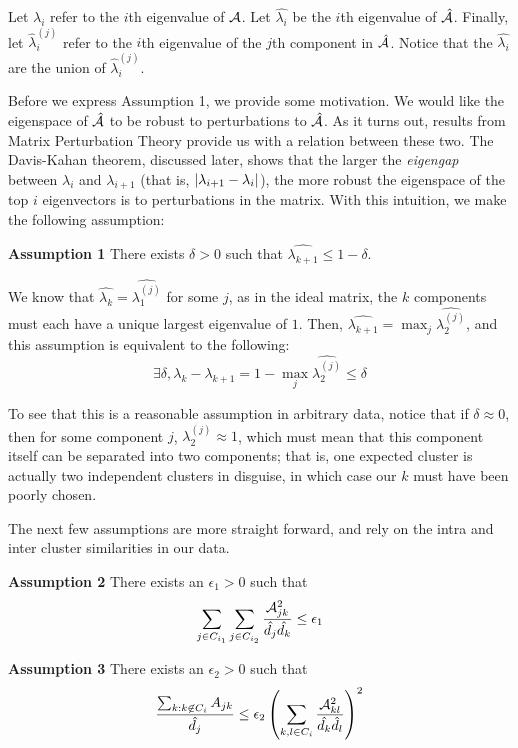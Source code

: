 Let $\lambda_i$ refer to the $i$th eigenvalue of $\mathcal{A}$. Let $\hat{\lambda_i}$
be the $i$th eigenvalue of $\hat{\mathcal{A}}$. Finally, let $\hat{\lambda}^{(j)}_i$
refer to the $i$th eigenvalue of the $j$th component in $\hat{\mathcal{A}}$. Notice that
the $\hat{\lambda_i}$ are the union of $\hat{\lambda}^{(j)}_i$.

Before we express Assumption 1, we provide some motivation. We would like
the eigenspace of $\hat{\mathcal{A}}$ to be robust to perturbations to $\hat{\mathcal{A}}$. As
it turns out, results from Matrix Perturbation Theory provide us with a relation
between these two. The Davis-Kahan theorem, discussed later, shows that the
larger the \textit{eigengap} between $\lambda_i$ and $\lambda_{i+1}$ (that is,
$\lvert\lambda_{i+1} - \lambda_i\rvert$), the more robust the eigenspace of the top
$i$ eigenvectors is to perturbations in the matrix. With this intuition, we
make the following assumption:

\textbf{Assumption 1} There exists $\delta > 0$ such that
$\hat{\lambda_{k+1}} \leq 1 - \delta$.

We know that $\hat{\lambda_k} = \hat{\lambda^{(j)}_1}$ for some $j$, as in the
ideal matrix, the $k$ components must each have a unique largest eigenvalue of
$1$. Then, $\hat{\lambda_{k+1}} = \max_j \hat{\lambda^{(j)}_2}$, and this
assumption is equivalent to the following:
\[ \exists \delta, \lambda_k - \lambda_{k+1} = 1 - \max_j \hat{\lambda^{(j)}_2} \leq \delta \]

To see that this is a reasonable assumption in arbitrary data, notice that if
$\delta \approx 0$, then for some component $j$, $\lambda^{(j)}_2 \approx 1$,
which must mean that this component itself can be separated into two components;
that is, one expected cluster is actually two independent clusters in disguise,
in which case our $k$ must have been poorly chosen.

The next few assumptions are more straight forward, and rely on the intra and
inter cluster similarities in our data. 

\textbf{Assumption 2}
    There exists an $\epsilon_1 > 0$ such that
    \[ \sum_{j \in C_{i_1}} \sum_{j \in C_{i_2}} \frac{\mathcal{A}_{jk}^2}{\hat{d_j} \hat{d_k}} \leq \epsilon_1 \]

\textbf{Assumption 3}
    There exists an $\epsilon_2 > 0$ such that
    \[ \frac{\sum_{k : k \not\in C_i} A_{jk}}{\hat{d_j}} \leq
            \epsilon_2 \left(\sum_{k, l \in C_i} \frac{\mathcal{A}_{kl}^2}{\hat{d_k}\hat{d_l}}\right)^2 \]

